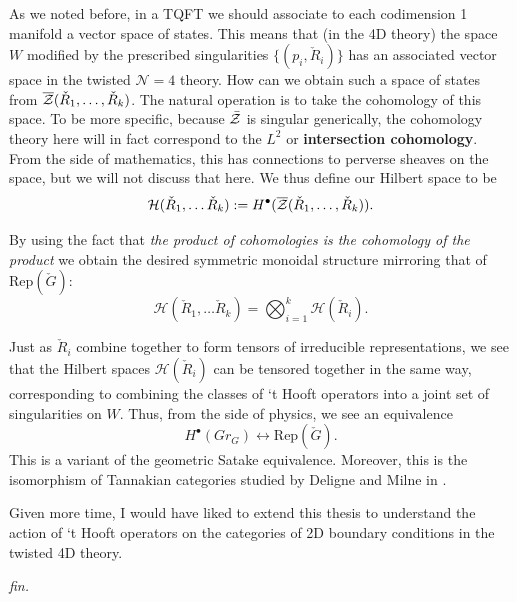 	As we noted before, in a TQFT we should associate to each codimension 1 manifold a vector space of states. This means that (in the 4D theory) the space $W$ modified by the prescribed singularities $\{(p_i, \check R_i) \}$ has an associated vector space in the twisted $\mathcal N=4$ theory. How can we obtain such a space of states from $\overline{\mathcal{Z}}(\check R_1, \dots, \check R_k)$. The natural operation \cite{witten2010} is to take the cohomology of this space. To be more specific, because $\bar {\mathcal{Z}}$ is singular generically, the cohomology theory here will in fact correspond to the $L^2$ or \textbf{intersection cohomology}. From the side of mathematics, this has connections to perverse sheaves on the space, but we will not discuss that here. We thus define our Hilbert space to be
	\[
		\mathcal H(\check R_1, \dots \check R_k) := H^\bullet (\overline{\mathcal{Z}}(\check R_1, \dots, \check R_k)).
	\]
	
	By using the fact that \emph{the product of cohomologies is the cohomology of the product} we obtain the desired symmetric monoidal structure mirroring that of $\mathrm{Rep} (\check G)$:
	\begin{equation}
		\mathcal H(\check R_1, \dots \check R_k) = \bigotimes_{i=1}^k \mathcal H(\check R_i).
	\end{equation}
	
	Just as $\check R_i$ combine together to form tensors of irreducible representations, we see that the Hilbert spaces $\mathcal H(\check R_i)$ can be tensored together in the same way, corresponding to combining the classes of `t Hooft operators into a joint set of singularities on $W$. Thus, from the side of physics, we see an equivalence 
	\begin{equation}
		H^\bullet (Gr_G) \leftrightarrow \mathrm{Rep}(\check G).
	\end{equation}
	This is a variant of the geometric Satake equivalence. Moreover, this is the isomorphism of Tannakian categories studied by Deligne and Milne in \cite{deligne1982}.
	
	Given more time, I would have liked to extend this thesis to understand the action of `t Hooft operators on the categories of 2D boundary conditions in the twisted 4D theory.
	
	\newpage
	\begin{center}
		\emph{fin.}
	\end{center}
	
	
